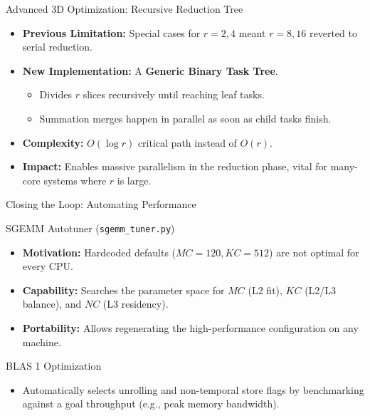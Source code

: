 \documentclass[aspectratio=169]{beamer}
\begin{document}
\begin{frame}{Advanced 3D Optimization: Recursive Reduction Tree}
  \begin{itemize}
    \item \textbf{Previous Limitation:} Special cases for $r=2, 4$ meant $r=8, 16$ reverted to serial reduction.
    \item \textbf{New Implementation:} A \textbf{Generic Binary Task Tree}.
      \begin{itemize}
        \item Divides $r$ slices recursively until reaching leaf tasks.
        \item Summation merges happen in parallel as soon as child tasks finish.
      \end{itemize}
    \item \textbf{Complexity:} $O(\log r)$ critical path instead of $O(r)$.
    \item \textbf{Impact:} Enables massive parallelism in the reduction phase, vital for many-core systems where $r$ is large.
  \end{itemize}
\end{frame}

\begin{frame}{Closing the Loop: Automating Performance}
  \begin{block}{SGEMM Autotuner (\texttt{sgemm\_tuner.py})}
    \begin{itemize}
      \item \textbf{Motivation:} Hardcoded defaults ($MC=120, KC=512$) are not optimal for every CPU.
      \item \textbf{Capability:} Searches the parameter space for $MC$ (L2 fit), $KC$ (L2/L3 balance), and $NC$ (L3 residency).
      \item \textbf{Portability:} Allows regenerating the high-performance configuration on any machine.
    \end{itemize}
  \end{block}
  \begin{block}{BLAS 1 Optimization}
    \begin{itemize}
      \item Automatically selects unrolling and non-temporal store flags by benchmarking against a goal throughput (e.g., peak memory bandwidth).
    \end{itemize}
  \end{block}
\end{frame}
\end{document}
